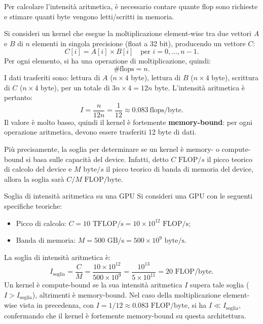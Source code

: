 Per calcolare l'intensità aritmetica, è necessario contare quante flop sono richieste e stimare quanti byte vengono letti/scritti in memoria.

\begin{example}{}
    Si consideri un kernel che esegue la moltiplicazione element-wise tra due vettori \(A\) e \(B\) di \(n\) elementi in singola precisione (float a 32 bit), producendo un vettore \(C\):
    \[
    C[i] = A[i] \times B[i] \quad \text{per } i = 0, \ldots, n-1.
    \]
    Per ogni elemento, si ha una operazione di moltiplicazione, quindi:
    \[
    \text{\#flops} = n.
    \]
    I dati trasferiti sono: lettura di \(A\) (\(n \times 4\) byte), lettura di \(B\) (\(n \times 4\) byte), scrittura di \(C\) (\(n \times 4\) byte), per un totale di \(3n \times 4 = 12n\) byte.
    L'intensità aritmetica è pertanto:
    \[
    I = \frac{n}{12n} = \frac{1}{12} \approx 0.083 \ \text{flops/byte}.
    \]
    Il valore è molto basso, quindi il kernel è fortemente \textbf{memory-bound}: per ogni operazione aritmetica, devono essere trasferiti 12 byte di dati.
\end{example}

Più precisamente, la soglia per determinare se un kernel è memory- o compute-bound si basa sulle capacità del device.
Infatti, detto \(C \text{ FLOP}/s\) il picco teorico di calcolo del device e \(M \text{ byte}/s\) il picco teorico di banda di memoria del device, allora la soglia sarà \(C/M \text{ FLOP}/\text{byte}\).

\begin{example}{Soglia di intensità aritmetica su una GPU}
    Si consideri una GPU con le seguenti specifiche teoriche:
    \begin{itemize}
        \item Picco di calcolo: \(C = 10 \text{ TFLOP/s} = 10 \times 10^{12} \text{ FLOP/s}\);
        \item Banda di memoria: \(M = 500 \text{ GB/s} = 500 \times 10^{9} \text{ byte/s}\).
    \end{itemize}
    La soglia di intensità aritmetica è:
    \[
    I_{\text{soglia}} = \frac{C}{M} = \frac{10 \times 10^{12}}{500 \times 10^{9}} = \frac{10^{13}}{5 \times 10^{11}} = 20 \text{ FLOP/byte}.
    \]
    Un kernel è compute-bound se la sua intensità aritmetica \(I\) supera tale soglia (\(I > I_{\text{soglia}}\)), altrimenti è memory-bound. 
    Nel caso della moltiplicazione element-wise vista in precedenza, con \(I = 1/12 \approx 0.083 \text{ FLOP/byte}\), si ha \(I \ll I_{\text{soglia}}\), confermando che il kernel è fortemente memory-bound su questa architettura.
\end{example}

